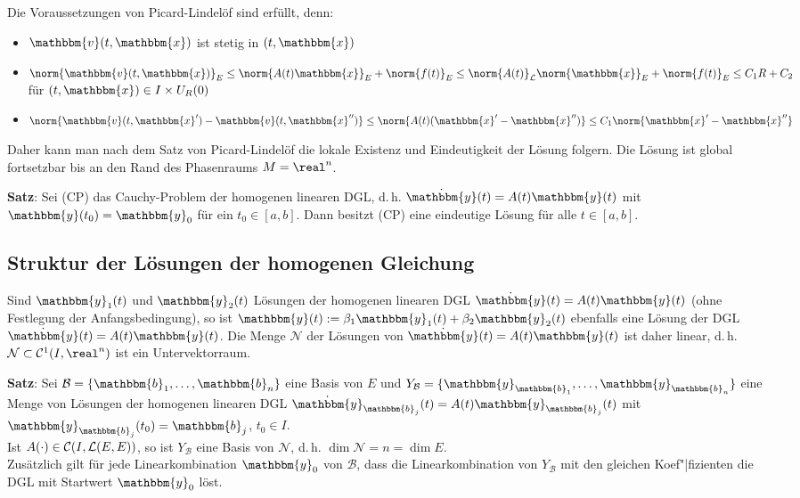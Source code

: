 Die Voraussetzungen von Picard-Lindelöf sind erfüllt, denn:
\begin{itemize}
    \item
    $\mathbbm{v}(t, \mathbbm{x})$ ist stetig in $(t, \mathbbm{x})$

    \item
    $\norm{\mathbbm{v}(t, \mathbbm{x})}_E \le
    \norm{A(t) \mathbbm{x}}_E + \norm{f(t)}_E \le
    \norm{A(t)}_\L \norm{\mathbbm{x}}_E + \norm{f(t)}_E \le
    C_1 R + C_2$ \\
    für $(t, \mathbbm{x}) \in I \times U_R(0)$

    \item
    $\norm{\mathbbm{v}(t, \mathbbm{x}') - \mathbbm{v}(t, \mathbbm{x}'')} \le
    \norm{A(t) (\mathbbm{x}' - \mathbbm{x}'')} \le
    C_1 \norm{\mathbbm{x}' - \mathbbm{x}''}$
\end{itemize}
Daher kann man nach dem Satz von Picard-Lindelöf die lokale Existenz und
Eindeutigkeit der Lösung folgern.
Die Lösung ist global fortsetzbar bis an den Rand des Phasenraums
$M = \real^n$.

\textbf{Satz}:
Sei (CP) das Cauchy-Problem der homogenen linearen DGL, d.\,h.
$\dot{\mathbbm{y}}(t) = A(t) \mathbbm{y}(t)$ mit
$\mathbbm{y}(t_0) = \mathbbm{y}_0$ für ein $t_0 \in [a, b]$.
Dann besitzt (CP) eine eindeutige Lösung für alle $t \in [a, b]$.

\pagebreak

\subsection{%
    Struktur der Lösungen der homogenen Gleichung%
}

Sind $\mathbbm{y}_1(t)$ und $\mathbbm{y}_2(t)$ Lösungen der homogenen
linearen DGL $\dot{\mathbbm{y}}(t) = A(t) \mathbbm{y}(t)$
(ohne Festlegung der Anfangsbedingung), so ist
$\mathbbm{y}(t) := \beta_1 \mathbbm{y}_1(t) + \beta_2 \mathbbm{y}_2(t)$
ebenfalls eine Lösung der DGL $\dot{\mathbbm{y}}(t) = A(t) \mathbbm{y}(t)$.
Die Menge $\mathcal{N}$ der Lösungen von
$\dot{\mathbbm{y}}(t) = A(t) \mathbbm{y}(t)$ ist daher linear, d.\,h.
$\mathcal{N} \subset \C^1(I, \real^n)$ ist ein Untervektorraum.

\textbf{Satz}:
Sei $\mathcal{B} = \{\mathbbm{b}_1, \dotsc, \mathbbm{b}_n\}$ eine Basis von $E$
und $Y_\mathcal{B} = \{\mathbbm{y}_{\mathbbm{b}_1}, \dotsc,
\mathbbm{y}_{\mathbbm{b}_n}\}$ eine Menge von Lösungen der
homogenen linearen DGL
$\dot{\mathbbm{y}}_{\mathbbm{b}_j}(t) = A(t) \mathbbm{y}_{\mathbbm{b}_j}(t)$
mit $\mathbbm{y}_{\mathbbm{b}_j}(t_0) = \mathbbm{b}_j$, $t_0 \in I$. \\
Ist $A(\cdot) \in \mathcal{C}(I, \mathcal{L}(E, E))$, so ist
$Y_\mathcal{B}$ eine Basis von $\mathcal{N}$, d.\,h.
$\dim \mathcal{N} = n = \dim E$. \\
Zusätzlich gilt für jede Linearkombination $\mathbbm{y}_0$
von $\mathcal{B}$, dass die
Linearkombination von $Y_\mathcal{B}$ mit den gleichen Koef"|fizienten die DGL
mit Startwert $\mathbbm{y}_0$ löst.


